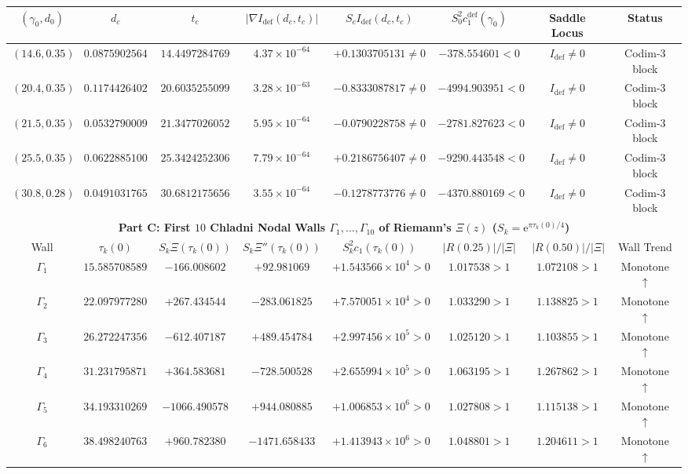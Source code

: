 \documentclass[11pt,reqno]{amsart}
\theoremstyle{definition}
\theoremstyle{remark}
\numberwithin{equation}{section}
\newcommand{\ee}{\mathrm{e}}
\newcommand{\defm}{\mathrm{def}}
\begin{document}
\begin{table}[htbp]
\begin{tabular}{@{}cccccccc@{}}
\midrule
$(\gamma_0, d_0)$ & $d_c$ & $t_c$ & $|\nabla I_{\defm}(d_c,t_c)|$ & $S_c I_{\defm}(d_c,t_c)$ & $S_0^2 c_1^{\defm}(\gamma_0)$ & Saddle Locus & Status \\
\midrule
$(14.6, 0.35)$ & $0.0875902564$ & $14.4497284769$ & $4.37 \times 10^{-64}$ & $+0.1303705131 \ne 0$ & $-378.554601 < 0$ & $I_{\defm} \ne 0$ & Codim-3 block \\
$(20.4, 0.35)$ & $0.1174426402$ & $20.6035255099$ & $3.28 \times 10^{-63}$ & $-0.8333087817 \ne 0$ & $-4994.903951 < 0$ & $I_{\defm} \ne 0$ & Codim-3 block \\
$(21.5, 0.35)$ & $0.0532790009$ & $21.3477026052$ & $5.95 \times 10^{-64}$ & $-0.0790228758 \ne 0$ & $-2781.827623 < 0$ & $I_{\defm} \ne 0$ & Codim-3 block \\
$(25.5, 0.35)$ & $0.0622885100$ & $25.3424252306$ & $7.79 \times 10^{-64}$ & $+0.2186756407 \ne 0$ & $-9290.443548 < 0$ & $I_{\defm} \ne 0$ & Codim-3 block \\
$(30.8, 0.28)$ & $0.0491031765$ & $30.6812175656$ & $3.55 \times 10^{-64}$ & $-0.1278773776 \ne 0$ & $-4370.880169 < 0$ & $I_{\defm} \ne 0$ & Codim-3 block \\
\midrule
\multicolumn{8}{c}{\textbf{Part C: First $10$ Chladni Nodal Walls $\Gamma_1,\dots,\Gamma_{10}$ of Riemann's $\Xi(z)$ ($S_k = \ee^{\pi\tau_k(0)/4}$)}} \\
\midrule
Wall & $\tau_k(0)$ & $S_k\Xi(\tau_k(0))$ & $S_k\Xi''(\tau_k(0))$ & $S_k^2 c_1(\tau_k(0))$ & $|R(0.25)|/|\Xi|$ & $|R(0.50)|/|\Xi|$ & Wall Trend \\
\midrule
$\Gamma_1$ & $15.5857085898$ & $-166.008602$ & $+92.981069$ & $+1.543566 \times 10^4 > 0$ & $1.017538 > 1$ & $1.072108 > 1$ & Monotone $\uparrow$ \\
$\Gamma_2$ & $22.0979772804$ & $+267.434544$ & $-283.061825$ & $+7.570051 \times 10^4 > 0$ & $1.033290 > 1$ & $1.138825 > 1$ & Monotone $\uparrow$ \\
$\Gamma_3$ & $26.2722473569$ & $-612.407187$ & $+489.454784$ & $+2.997456 \times 10^5 > 0$ & $1.025120 > 1$ & $1.103855 > 1$ & Monotone $\uparrow$ \\
$\Gamma_4$ & $31.2317958710$ & $+364.583681$ & $-728.500528$ & $+2.655994 \times 10^5 > 0$ & $1.063195 > 1$ & $1.267862 > 1$ & Monotone $\uparrow$ \\
$\Gamma_5$ & $34.1933102690$ & $-1066.490578$ & $+944.080885$ & $+1.006853 \times 10^6 > 0$ & $1.027808 > 1$ & $1.115138 > 1$ & Monotone $\uparrow$ \\
$\Gamma_6$ & $38.4982407638$ & $+960.782380$ & $-1471.658433$ & $+1.413943 \times 10^6 > 0$ & $1.048801 > 1$ & $1.204611 > 1$ & Monotone $\uparrow$ \\

\end{tabular}
\end{table}
\end{document}
